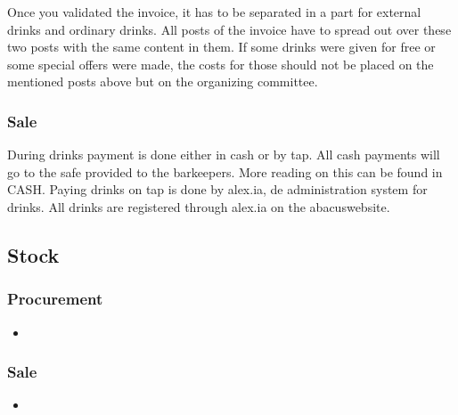\documentclass{report}
\begin{document}
Once you validated the invoice, it has to be separated in a part for external drinks and ordinary drinks. All posts of the invoice have to spread out over these two posts with the same content in them. If some drinks were given for free or some special offers were made, the costs for those should not be placed on the mentioned posts above but on the organizing committee.  

\subsubsection{Sale}
During drinks payment is done either in cash or by tap. All cash payments will go to the safe provided to the barkeepers. More reading on this can be found in CASH. Paying drinks on tap is done by alex.ia, de administration system for drinks. All drinks are registered through alex.ia on the abacuswebsite.  

\subsection{Stock}
\subsubsection{Procurement}
\begin{itemize} 
\vspace{-1mm}
\itemsep-1mm 
\item 
\end{itemize}

\subsubsection{Sale}
\begin{itemize}
\vspace{-1mm}
\itemsep-1mm 
\item
\end{itemize}
\end{document}
